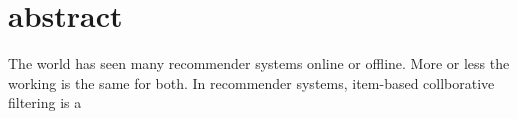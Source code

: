 
\section*{abstract}
    The world has seen many recommender systems online or offline. More or less the working is the same for both. In recommender systems, item-based collborative filtering is a 
    

